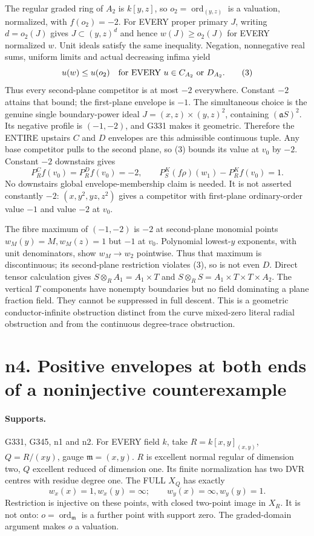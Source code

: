 The regular graded ring of $A_2$ is $k[y,z]$, so $o_2=\operatorname{ord}_{(y,z)}$ is a valuation, normalized, with $f(o_2)=-2$. For EVERY proper primary $J$, writing $d=o_2(J)$ gives $J\subset(y,z)^d$ and hence $w(J)\ge o_2(J)$ for EVERY normalized $w$. Unit ideals satisfy the same inequality. Negation, nonnegative real sums, uniform limits and actual decreasing infima yield
\[
 u(w)\le u(o_2)\quad\hbox{for EVERY }u\in C_{A_2}\text{ or }D_{A_2}. \tag{3}
\]
Thus every second-plane competitor is at most $-2$ everywhere. Constant $-2$ attains that bound; the first-plane envelope is $-1$. The simultaneous choice is the genuine single boundary-power ideal
$J=(x,z)\times(y,z)^2$, containing $(\mathfrak aS)^2$. Its negative profile is $(-1,-2)$, and G331 makes it geometric. Therefore the ENTIRE upstairs $C$ and $D$ envelopes are this admissible continuous tuple. Any base competitor pulls to the second plane, so (3) bounds its value at $v_0$ by $-2$. Constant $-2$ downstairs gives
\[
 P_R^Cf(v_0)=P_R^Df(v_0)=-2,\qquad
 P_S^K(f\rho)(w_1)-P_R^Kf(v_0)=1. \tag{4}
\]
No downstairs global envelope-membership claim is needed. It is not asserted constantly $-2$: $(x,y^2,yz,z^2)$ gives a competitor with first-plane ordinary-order value $-1$ and value $-2$ at $v_0$.

The fibre maximum of $(-1,-2)$ is $-2$ at second-plane monomial points $w_M(y)=M,w_M(z)=1$ but $-1$ at $v_0$. Polynomial lowest-$y$ exponents, with unit denominators, show $w_M\to w_2$ pointwise. Thus that maximum is discontinuous; its second-plane restriction violates (3), so is not even $D$. Direct tensor calculation gives
$S\otimes_R A_1=A_1\times T$ and $S\otimes_R S=A_1\times T\times T\times A_2$. The vertical $T$ components have nonempty boundaries but no field dominating a plane fraction field. They cannot be suppressed in full descent. This is a geometric conductor-infinite obstruction distinct from the curve mixed-zero literal radial obstruction and from the continuous degree-trace obstruction.


\section{n4. Positive envelopes at both ends of a noninjective counterexample}
\paragraph{Supports.} G331, G345, n1 and n2.
For EVERY field $k$, take $R=k[x,y]_{(x,y)}$, $Q=R/(xy)$, gauge $\mathfrak m=(x,y)$. $R$ is excellent normal regular of dimension two, $Q$ excellent reduced of dimension one. Its finite normalization has two DVR centres with residue degree one. The FULL $X_Q$ has exactly
\[
 w_x(x)=1,w_x(y)=\infty;\qquad w_y(x)=\infty,w_y(y)=1.
\]
Restriction is injective on these points, with closed two-point image in $X_R$. It is not onto: $o=\operatorname{ord}_{\mathfrak m}$ is a further point with support zero. The graded-domain argument makes $o$ a valuation.

